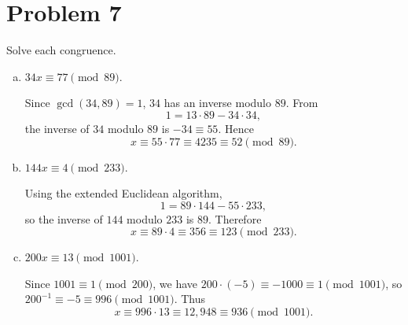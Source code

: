 \section*{Problem 7}

Solve each congruence.

\begin{enumerate}[(a)]
\item $34x \equiv 77 \pmod{89}$.

Since $\gcd(34,89)=1$, $34$ has an inverse modulo $89$. From
\[
1=13\cdot 89-34\cdot 34,
\]
the inverse of $34$ modulo $89$ is $-34\equiv 55$. Hence
\[
x \equiv 55\cdot 77 \equiv 4235 \equiv \boxed{52} \pmod{89}.
\]

\item $144x \equiv 4 \pmod{233}$.

Using the extended Euclidean algorithm,
\[
1 = 89\cdot 144 - 55\cdot 233,
\]
so the inverse of $144$ modulo $233$ is $89$. Therefore
\[
x \equiv 89\cdot 4 \equiv 356 \equiv \boxed{123} \pmod{233}.
\]

\item $200x \equiv 13 \pmod{1001}$.

Since $1001 \equiv 1 \pmod{200}$, we have $200\cdot(-5)\equiv -1000 \equiv 1 \pmod{1001}$,
so $200^{-1}\equiv -5 \equiv 996 \pmod{1001}$. Thus
\[
x \equiv 996\cdot 13 \equiv 12{,}948 \equiv \boxed{936} \pmod{1001}.
\]
\end{enumerate}
